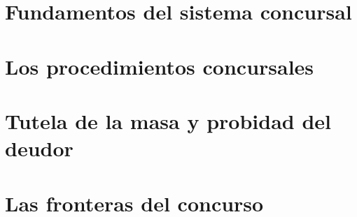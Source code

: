 \documentclass[11pt,a4paper,twoside,openright,extrafontsizes]{memoir}
\begin{document}
\frontmatter




\cleardoublepage
\tableofcontents*

\mainmatter

\part{Fundamentos del sistema concursal}







\part{Los procedimientos concursales}







\part{Tutela de la masa y probidad del deudor}





\part{Las fronteras del concurso}



\end{document}
